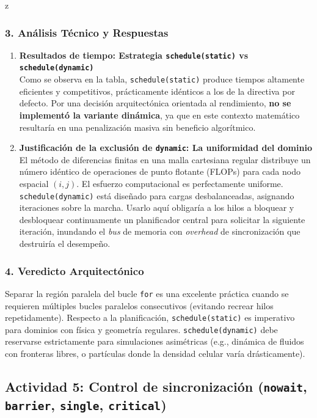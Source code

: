 z\documentclass[11pt,a4paper]{article}
\begin{document}
\subsubsection*{3. Análisis Técnico y Respuestas}

\begin{enumerate}
    \item \textbf{Resultados de tiempo: Estrategia \texttt{schedule(static)} vs \texttt{schedule(dynamic)}}\\
    Como se observa en la tabla, \texttt{schedule(static)} produce tiempos altamente eficientes y competitivos, prácticamente idénticos a los de la directiva por defecto. Por una decisión arquitectónica orientada al rendimiento, \textbf{no se implementó la variante dinámica}, ya que en este contexto matemático resultaría en una penalización masiva sin beneficio algorítmico.

    \item \textbf{Justificación de la exclusión de \texttt{dynamic}: La uniformidad del dominio}\\
    El método de diferencias finitas en una malla cartesiana regular distribuye un número idéntico de operaciones de punto flotante (FLOPs) para cada nodo espacial $(i,j)$. El esfuerzo computacional es perfectamente uniforme. \texttt{schedule(dynamic)} está diseñado para cargas desbalanceadas, asignando iteraciones sobre la marcha. Usarlo aquí obligaría a los hilos a bloquear y desbloquear continuamente un planificador central para solicitar la siguiente iteración, inundando el \textit{bus} de memoria con \textit{overhead} de sincronización que destruiría el desempeño.
\end{enumerate}

\subsubsection*{4. Veredicto Arquitectónico}
Separar la región paralela del bucle \texttt{for} es una excelente práctica cuando se requieren múltiples bucles paralelos consecutivos (evitando recrear hilos repetidamente). Respecto a la planificación, \texttt{schedule(static)} es imperativo para dominios con física y geometría regulares. \texttt{schedule(dynamic)} debe reservarse estrictamente para simulaciones asimétricas (e.g., dinámica de fluidos con fronteras libres, o partículas donde la densidad celular varía drásticamente).

\subsection*{Actividad 5: Control de sincronización (\texttt{nowait}, \texttt{barrier}, \texttt{single}, \texttt{critical})}
\end{document}
